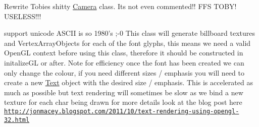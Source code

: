 
\begin{DoxyRefList}
\item[\label{todo__todo000001}%
\hypertarget{todo__todo000001}{}%
File \hyperlink{_camera_8h}{Camera.h} ]Rewrite Tobies shitty \hyperlink{class_camera}{Camera} class. Its not even commented!! F\-F\-S T\-O\-B\-Y! U\-S\-E\-L\-E\-S\-S!!!  
\item[\label{todo__todo000002}%
\hypertarget{todo__todo000002}{}%
File \hyperlink{_text_8h}{Text.h} ]support unicode A\-S\-C\-I\-I is so 1980's ;-\/0 This class will generate billboard textures and Vertex\-Array\-Objects for each of the font glyphs, this means we need a valid Open\-G\-L context before using this class, therefore it should be constructed in initalize\-G\-L or after. Note for efficiency once the font has been created we can only change the colour, if you need different sizes / emphasis you will need to create a new \hyperlink{class_text}{Text} object with the desired size / emphasis. This is accelerated as much as possible but text rendering will sometimes be slow as we bind a new texture for each char being drawn for more details look at the blog post here \href{http://jonmacey.blogspot.com/2011/10/text-rendering-using-opengl-32.html}{\tt http\-://jonmacey.\-blogspot.\-com/2011/10/text-\/rendering-\/using-\/opengl-\/32.\-html} 
\end{DoxyRefList}